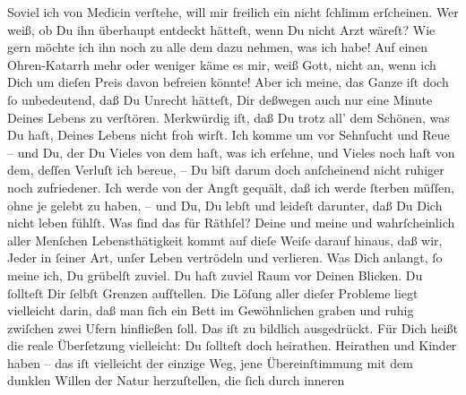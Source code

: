 \begin{ledgroupsized}[t]{13cm}
               Soviel ich von Medicin verſtehe, will mir freilich ein \label{K_L02792-15v}\label{K_L02792-15h} nicht ſchlimm erſcheinen. Wer weiß, ob Du ihn
               überhaupt entdeckt hätteſt, {\pb}wenn Du nicht Arzt
               wäreſt? Wie gern möchte ich ihn noch zu alle dem dazu nehmen, was ich habe! Auf einen
               Ohren-Katarrh mehr oder weniger käme es mir, weiß Gott, nicht an, wenn ich Dich \strikeout{\textcolor{gray}{von}} um dieſen Preis davon befreien könnte! Aber ich meine, das Ganze iſt doch ſo
               unbedeutend, daß Du Unrecht hätteſt, Dir deßwegen auch nur eine Minute Deines Lebens
               zu verſtören.\pend
           \pstart
           Merkwürdig iſt, daß Du trotz all’ dem Schönen, was Du haſt, Deines Lebens nicht froh
               wirſt. Ich komme um vor Sehnſucht und Reue – und Du, der Du Vieles von dem haſt, was
               ich erſehne, und Vieles noch haſt von dem, deſſen Verluſt ich bereue, – Du biſt darum
               doch {\pb}anſcheinend nicht ruhiger noch zufriedener.
               Ich werde von der Angſt gequält, daß ich werde ſterben müſſen, ohne je gelebt zu
               haben, – und Du, Du lebſt und leideſt darunter, daß Du Dich nicht leben fühlſt. Was
               ſind das für Räthſel? Deine und meine und 
               wahrſcheinlich aller Menſchen Lebensthätigkeit kommt auf dieſe Weiſe darauf hinaus,
               daß wir, Jeder in ſeiner Art, unſer Leben vertrödeln und verlieren. Was Dich anlangt,
               ſo meine ich, Du grübelſt zuviel. Du haſt zuviel Raum vor Deinen Blicken. \strikeout{\textcolor{gray}{×}} Du ſollteſt Dir ſelbſt Grenzen aufſtellen. Die Löſung aller dieſer Probleme
                  {\pb}liegt vielleicht darin, daß man ſich ein Bett im
               Gewöhnlichen graben und ruhig zwiſchen zwei Ufern hinfließen ſoll. Das iſt zu
               bildlich ausgedrückt. Für Dich heißt die reale Überſetzung vielleicht: Du ſollteſt
               doch heirathen. Heirathen und Kinder haben – das iſt vielleicht der einzige Weg, jene
               Übereinſtimmung mit dem dunklen Willen der Natur herzuſtellen, die ſich durch inneren

\end{ledgroupsized}
